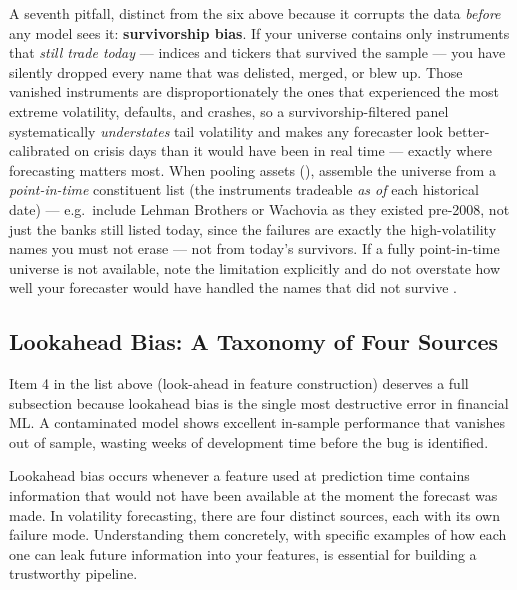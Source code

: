 \begin{warning}
A seventh pitfall, distinct from the six above because it corrupts the data \emph{before} any model sees it: \textbf{survivorship bias}.
If your universe contains only instruments that \emph{still trade today} --- indices and tickers that survived the sample --- you have silently dropped every name that was delisted, merged, or blew up.
Those vanished instruments are disproportionately the ones that experienced the most extreme volatility, defaults, and crashes, so a survivorship-filtered panel systematically \emph{understates} tail volatility and makes any forecaster look better-calibrated on crisis days than it would have been in real time --- exactly where forecasting matters most.
When pooling assets (), assemble the universe from a \emph{point-in-time} constituent list (the instruments tradeable \emph{as of} each historical date) --- e.g.\ include Lehman Brothers or Wachovia as they existed pre-2008, not just the banks still listed today, since the failures are exactly the high-volatility names you must not erase --- not from today's survivors. If a fully point-in-time universe is not available, note the limitation explicitly and do not overstate how well your forecaster would have handled the names that did not survive \citep{LopezdePrado2018}.
\end{warning}


\subsection{Lookahead Bias: A Taxonomy of Four Sources}
\label{sec:eval-lookahead-taxonomy}

Item 4 in the list above (look-ahead in feature construction) deserves a full subsection because lookahead bias is the single most destructive error in financial ML.
A contaminated model shows excellent in-sample performance that vanishes out of sample, wasting weeks of development time before the bug is identified.

Lookahead bias occurs whenever a feature used at prediction time contains information that would not have been available at the moment the forecast was made.
In volatility forecasting, there are four distinct sources, each with its own failure mode.
Understanding them concretely, with specific examples of how each one can leak future information into your features, is essential for building a trustworthy pipeline.


